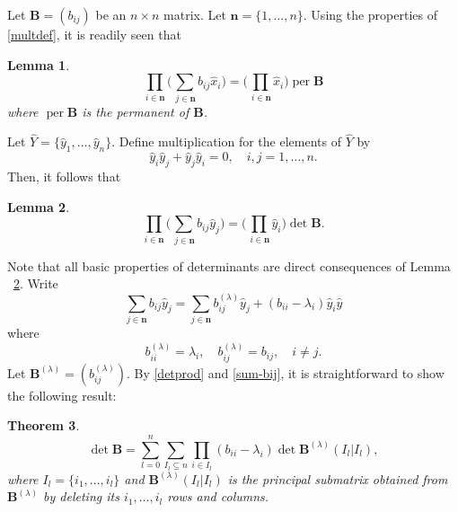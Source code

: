 \documentclass[draft]{amsart}
\newtheorem{thm}{Theorem}[section]
\newtheorem{lem}[thm]{Lemma}
\theoremstyle{definition}
\theoremstyle{remark}
\newcommand{\per}{\operatorname{per}}
\begin{document}
Let $\mathbf{B}=(b_{ij})$ be an $n\times n$ matrix. Let $\mathbf{n}=\{1,
\dots,n\}$. Using the properties of \eqref{multdef}, it is readily seen that
\begin{lem}\label{lem-per}
\begin{equation}
\prod_{i\in\mathbf{n}}\biggl(\sum_{\,j\in\mathbf{n}}b_{ij}\hat x_i\biggr)=
\biggl(\prod_{\,i\in\mathbf{n}}\hat x_i\biggr)\per \mathbf{B}
\end{equation}
where $\per \mathbf{B}$ is the permanent of $\mathbf{B}$.
\end{lem}

Let $\widehat Y=\{\hat y_1,\dots,\hat y_n\}$. Define multiplication
for the elements of $\widehat Y$ by
\begin{equation}
\hat y_i\hat y_j+\hat y_j\hat y_i=0,\quad i,j=1,\dots,n.
\end{equation}
Then, it follows that
\begin{lem}\label{lem-det}
\begin{equation}\label{detprod}
\prod_{i\in\mathbf{n}}\biggl(\sum_{\,j\in\mathbf{n}}b_{ij}\hat y_j\biggr)=
\biggl(\prod_{\,i\in\mathbf{n}}\hat y_i\biggr)\det\mathbf{B}.
\end{equation}
\end{lem}

Note that all basic properties of determinants are direct consequences
of Lemma ~\ref{lem-det}. Write
\begin{equation}\label{sum-bij}
\sum_{j\in\mathbf{n}}b_{ij}\hat y_j=\sum_{j\in\mathbf{n}}b^{(\lambda)}
_{ij}\hat y_j+(b_{ii}-\lambda_i)\hat y_i\hat y
\end{equation}
where
\begin{equation}
b^{(\lambda)}_{ii}=\lambda_i,\quad b^{(\lambda)}_{ij}=b_{ij},
\quad i\not=j.
\end{equation}
Let $\mathbf{B}^{(\lambda)}=(b^{(\lambda)}_{ij})$. By \eqref{detprod}
and \eqref{sum-bij}, it is
straightforward to show the following
result:
\begin{thm}\label{thm-main}
\begin{equation}\label{detB}
\det\mathbf{B}=
\sum^n_{l =0}\sum_{I_l \subseteq n}
\prod_{i\in I_l}(b_{ii}-\lambda_i)
\det\mathbf{B}^{(\lambda)}(I_l |I_l ),
\end{equation}
where $I_l =\{i_1,\dots,i_l \}$ and $\mathbf{B}^{(\lambda)}(I_l |I_l )$
is the principal submatrix obtained from $\mathbf{B}^{(\lambda)}$
by deleting its $i_1,\dots,i_l $ rows and columns.
\end{thm}
\end{document}
